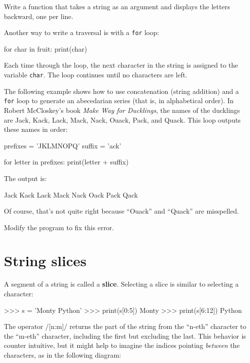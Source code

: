 \begin{exercise}
Write a function that takes a string as an argument
and displays the letters backward, one per line.
\end{exercise}

Another way to write a traversal is with a {\tt for} loop:

\beforeverb
\begin{pycode}
for char in fruit:
    print(char)
\end{pycode}
\afterverb
%
Each time through the loop, the next character in the string is assigned
to the variable {\tt char}.  The loop continues until no characters are
left.


The following example shows how to use concatenation (string addition)
and a {\tt for} loop to generate an abecedarian series (that is, in
alphabetical order).  In Robert McCloskey's book {\em Make
Way for Ducklings}, the names of the ducklings are Jack, Kack, Lack,
Mack, Nack, Ouack, Pack, and Quack.  This loop outputs these names in
order:

\beforeverb
\begin{pycode}
prefixes = 'JKLMNOPQ'
suffix = 'ack'

for letter in prefixes:
    print(letter + suffix)
\end{pycode}
\afterverb
%
The output is:

\beforeverb
\begin{pycode}
Jack
Kack
Lack
Mack
Nack
Oack
Pack
Qack
\end{pycode}
\afterverb
%
Of course, that's not quite right because ``Ouack'' and
``Quack'' are misspelled.

\begin{exercise}
Modify the program to fix this error.
\end{exercise}



\section{String slices}
\label{slice}


A segment of a string is called a {\bf slice}.  Selecting a slice is
similar to selecting a character:

\beforeverb
\begin{pycode}
>>> s = 'Monty Python'
>>> print(s[0:5])
Monty
>>> print(s[6:12])
Python
\end{pycode}
\afterverb
%
The operator {\pyinline/[n:m]/} returns the part of the string from the 
``n-eth'' character to the ``m-eth'' character, including the first but
excluding the last.  This behavior is counter intuitive, but it might
help to imagine the indices pointing {\em between} the
characters, as in the following diagram:

